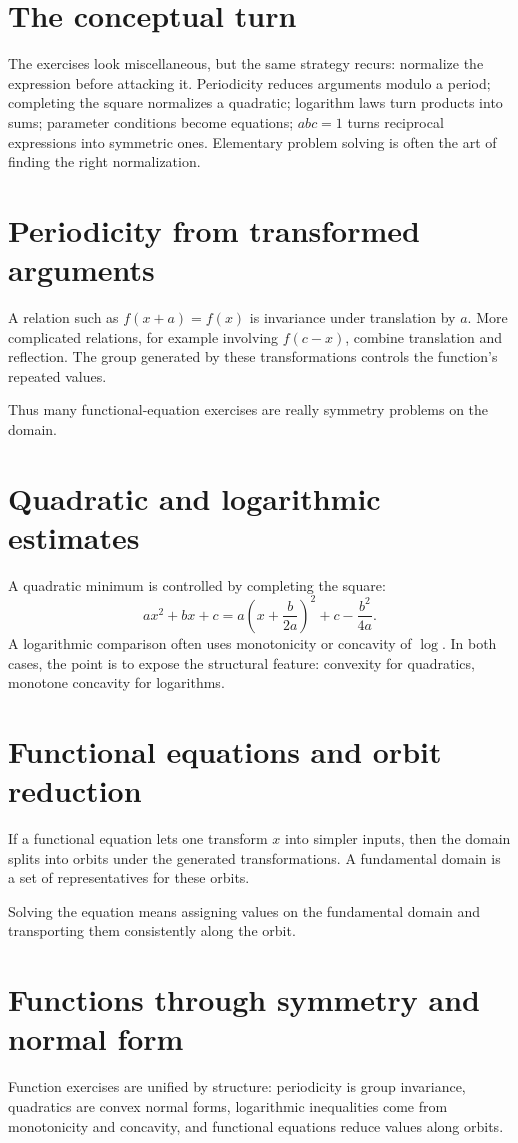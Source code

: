 \section{The conceptual turn}

The exercises look miscellaneous, but the same strategy recurs: normalize the expression before attacking it.  Periodicity reduces arguments modulo a period; completing the square normalizes a quadratic; logarithm laws turn products into sums; parameter conditions become equations; \(abc=1\) turns reciprocal expressions into symmetric ones.  Elementary problem solving is often the art of finding the right normalization.

\section{Periodicity from transformed arguments}

A relation such as \(f(x+a)=f(x)\) is invariance under translation by \(a\).  More complicated relations, for example involving \(f(c-x)\), combine translation and reflection.  The group generated by these transformations controls the function's repeated values.

Thus many functional-equation exercises are really symmetry problems on the domain.

\section{Quadratic and logarithmic estimates}

A quadratic minimum is controlled by completing the square:
\[
  ax^2+bx+c=a\left(x+\frac b{2a}\right)^2+c-\frac{b^2}{4a}.
\]
A logarithmic comparison often uses monotonicity or concavity of \(\log\).  In both cases, the point is to expose the structural feature: convexity for quadratics, monotone concavity for logarithms.

\section{Functional equations and orbit reduction}

If a functional equation lets one transform \(x\) into simpler inputs, then the domain splits into orbits under the generated transformations.  A fundamental domain is a set of representatives for these orbits.

Solving the equation means assigning values on the fundamental domain and transporting them consistently along the orbit.

\section{Functions through symmetry and normal form}

Function exercises are unified by structure: periodicity is group invariance, quadratics are convex normal forms, logarithmic inequalities come from monotonicity and concavity, and functional equations reduce values along orbits.
